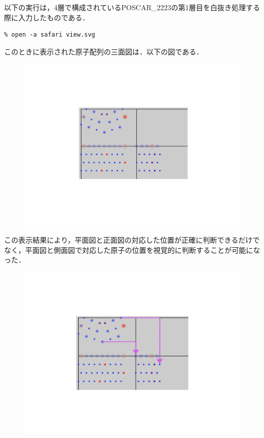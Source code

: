 以下の実行は，4層で構成されているPOSCAR\_2223の第1層目を白抜き処理する際に入力したものである．
\begin{lstlisting}[style=customCsh,basicstyle={\scriptsize\ttfamily}]
% ruby viewer.rb POSCAR_2223 POSCAR_2223_4 1/4
% open -a safari view.svg 
\end{lstlisting}
このときに表示された原子配列の三面図は．以下の図である．

\begin{figure}[htbp]\begin{center}
\includegraphics[width=12cm,bb= 0 0 937 753]{../figs/./boundary_narita.015.jpeg}
\caption{}
\label{default}\end{center}\end{figure}
この表示結果により，平面図と正面図の対応した位置が正確に判断できるだけでなく，平面図と側面図で対応した原子の位置を視覚的に判断することが可能になった．

\begin{figure}[htbp]\begin{center}
\includegraphics[width=12cm,bb= 0 0 937 753]{../figs/./boundary_narita.016.jpeg}
\caption{}
\label{default}\end{center}\end{figure}
